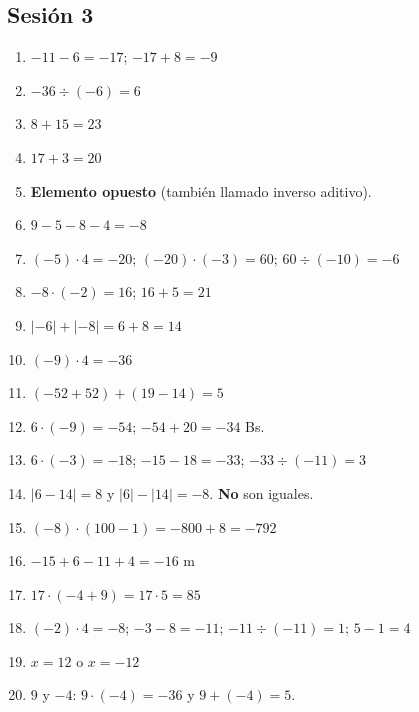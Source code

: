 \documentclass[12pt, letterpaper]{article}
\begin{document}
\subsection*{Sesión 3}
\begin{enumerate}[leftmargin=*, label=\textbf{\arabic*.}]
  \item $-11 - 6 = -17$; $-17 + 8 = -9$
  \item $-36 \div (-6) = 6$
  \item $8 + 15 = 23$
  \item $17 + 3 = 20$
  \item \textbf{Elemento opuesto} (también llamado inverso aditivo).
  \item $9 - 5 - 8 - 4 = -8$
  \item $(-5) \cdot 4 = -20$; $(-20) \cdot (-3) = 60$; $60 \div (-10) = -6$
  \item $-8 \cdot (-2) = 16$; $16 + 5 = 21$
  \item $|-6| + |-8| = 6 + 8 = 14$
  \item $(-9) \cdot 4 = -36$
  \item $(-52 + 52) + (19 - 14) = 5$
  \item $6 \cdot (-9) = -54$; $-54 + 20 = -34$ Bs.
  \item $6 \cdot (-3) = -18$; $-15 - 18 = -33$; $-33 \div (-11) = 3$
  \item $|6 - 14| = 8$ y $|6| - |14| = -8$. \textbf{No} son iguales.
  \item $(-8) \cdot (100 - 1) = -800 + 8 = -792$
  \item $-15 + 6 - 11 + 4 = -16$ m
  \item $17 \cdot (-4 + 9) = 17 \cdot 5 = 85$
  \item $(-2) \cdot 4 = -8$; $-3 - 8 = -11$; $-11 \div (-11) = 1$; $5 - 1 = 4$
  \item $x = 12$ o $x = -12$
  \item $9$ y $-4$: $9 \cdot (-4) = -36$ y $9 + (-4) = 5$.
\end{enumerate}
\end{document}

